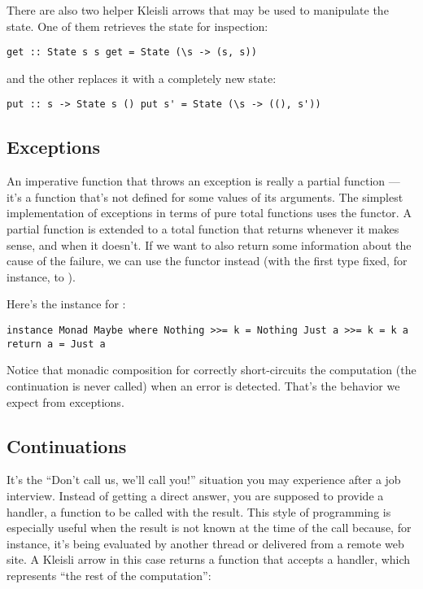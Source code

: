 There are also two helper Kleisli arrows that may be used to manipulate
the state. One of them retrieves the state for inspection:

\begin{verbatim}
get :: State s s get = State (\s -> (s, s))
\end{verbatim}

and the other replaces it with a completely new state:

\begin{verbatim}
put :: s -> State s () put s' = State (\s -> ((), s'))
\end{verbatim}

\subsection{Exceptions}\label{exceptions}

An imperative function that throws an exception is really a partial
function --- it's a function that's not defined for some values of its
arguments. The simplest implementation of exceptions in terms of pure
total functions uses the  functor. A partial function is
extended to a total function that returns  whenever it
makes sense, and  when it doesn't. If we want to also
return some information about the cause of the failure, we can use the
 functor instead (with the first type fixed, for
instance, to ).

Here's the  instance for :

\begin{verbatim}
instance Monad Maybe where Nothing >>= k = Nothing Just a >>= k = k a return a = Just a
\end{verbatim}

Notice that monadic composition for  correctly
short-circuits the computation (the continuation  is never
called) when an error is detected. That's the behavior we expect from
exceptions.

\subsection{Continuations}\label{continuations}

It's the ``Don't call us, we'll call you!'' situation you may experience
after a job interview. Instead of getting a direct answer, you are
supposed to provide a handler, a function to be called with the result.
This style of programming is especially useful when the result is not
known at the time of the call because, for instance, it's being
evaluated by another thread or delivered from a remote web site. A
Kleisli arrow in this case returns a function that accepts a handler,
which represents ``the rest of the computation'':

